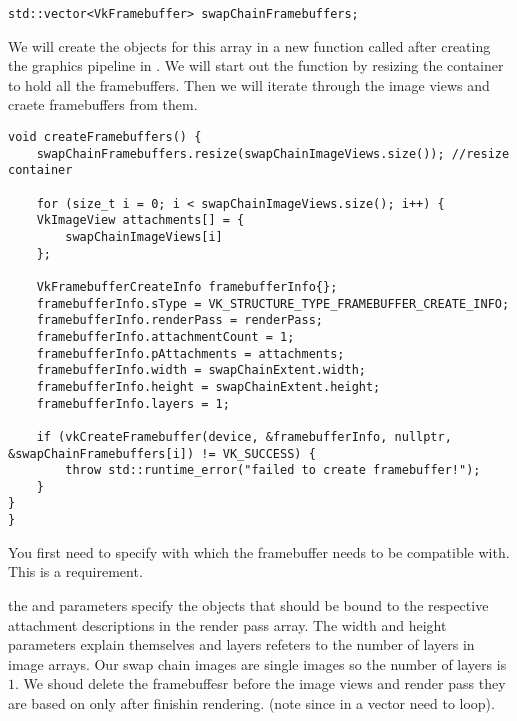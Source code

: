 \begin{center}
\begin{minipage}{0.95\linewidth}
\begin{lstlisting}
std::vector<VkFramebuffer> swapChainFramebuffers;
\end{lstlisting}
\end{minipage}
\end{center}

\par We will create the objects for this array in a new  function called after creating the graphics pipeline in . We will start out the function by resizing the container to hold all the framebuffers. Then we will iterate through the image views and craete framebuffers from them.

\begin{center}
\begin{minipage}{0.95\linewidth}
\begin{lstlisting}
void createFramebuffers() {
    swapChainFramebuffers.resize(swapChainImageViews.size()); //resize container

    for (size_t i = 0; i < swapChainImageViews.size(); i++) {
    VkImageView attachments[] = {
        swapChainImageViews[i]
    };

    VkFramebufferCreateInfo framebufferInfo{};
    framebufferInfo.sType = VK_STRUCTURE_TYPE_FRAMEBUFFER_CREATE_INFO;
    framebufferInfo.renderPass = renderPass;
    framebufferInfo.attachmentCount = 1;
    framebufferInfo.pAttachments = attachments;
    framebufferInfo.width = swapChainExtent.width;
    framebufferInfo.height = swapChainExtent.height;
    framebufferInfo.layers = 1;

    if (vkCreateFramebuffer(device, &framebufferInfo, nullptr, &swapChainFramebuffers[i]) != VK_SUCCESS) {
        throw std::runtime_error("failed to create framebuffer!");
    }
}
}
\end{lstlisting}
\end{minipage}
\end{center}

\par You first need to specify with which  the framebuffer needs to be compatible with. This is a requirement.

\par the  and  parameters specify the  objects that should be bound to the respective attachment descriptions in the render pass  array. The width and height parameters explain themselves and layers refeters to the number of layers in image arrays. Our swap chain images are single images so the number of layers is $1$. We shoud delete the framebuffesr before the image views and render pass they are based on only after finishin rendering. (note since in a vector need to loop).


